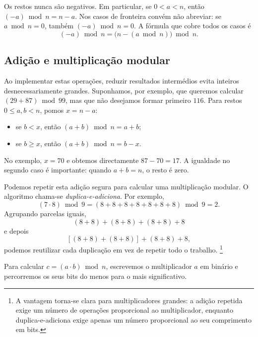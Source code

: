 Os restos nunca são negativos. Em particular, se \(0<a<n\), então
\((-a)\bmod n=n-a\). Nos casos de fronteira convém não abreviar: se
\(a\bmod n=0\), também \((-a)\bmod n=0\). A fórmula que cobre todos os casos é
\[
(-a)\bmod n=\bigl(n-(a\bmod n)\bigr)\bmod n.
\]


\subsection{Adição e multiplicação modular}
\label{subsec:modular-addition-multiplication}

Ao implementar estas operações, reduzir resultados intermédios evita inteiros
desnecessariamente grandes. Suponhamos, por exemplo, que queremos calcular
\((29+87)\bmod 99\), mas que não desejamos formar primeiro \(116\). Para
restos \(0\leq a,b<n\), pomos \(x=n-a\):
\begin{itemize}
    \item se \(b<x\), então \((a+b)\bmod n=a+b\);
    \item se \(b\geq x\), então \((a+b)\bmod n=b-x\).
\end{itemize}
No exemplo, \(x=70\) e obtemos directamente \(87-70=17\). A igualdade no
segundo caso é importante: quando \(a+b=n\), o resto é zero.

Podemos repetir esta adição segura para calcular uma multiplicação modular. O
algoritmo chama-se {\em duplica-e-adiciona}. Por exemplo,
\[
(7\cdot 8)\bmod 9=(8+8+8+8+8+8+8)\bmod 9=2.
\]
Agrupando parcelas iguais,
\[
(8+8)+(8+8)+(8+8)+8
\]
e depois
\[
[(8+8)+(8+8)]+(8+8)+8,
\]
podemos reutilizar cada duplicação em vez de repetir todo o trabalho.
\footnote{A vantagem torna-se clara para multiplicadores grandes: a adição
repetida exige um número de operações proporcional ao multiplicador, enquanto
duplica-e-adiciona exige apenas um número proporcional ao seu comprimento em
bits.}

Para calcular \(c=(a\cdot b)\bmod n\), escrevemos o multiplicador \(a\) em
binário e percorremos os seus bits do menos para o mais significativo.



